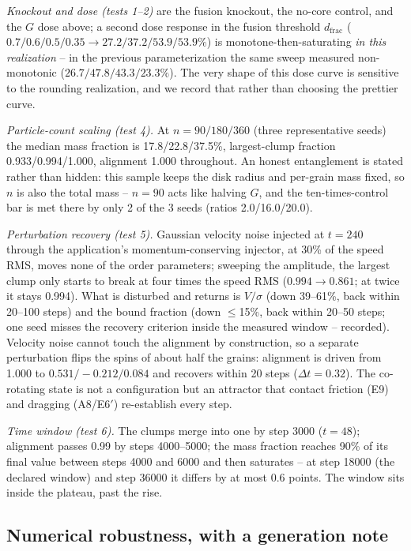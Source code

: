 \documentclass[aps,reprint,amsmath,amssymb,nofootinbib,superscriptaddress,floatfix]{revtex4-2}
\begin{document}
\emph{Knockout and dose (tests 1--2)} are the fusion knockout, the
no-core control, and the $G$ dose above; a second dose response in the
fusion threshold $d_{\mathrm{frac}}$ ($0.7/0.6/0.5/0.35 \rightarrow
27.2/37.2/53.9/53.9\%$) is monotone-then-saturating \emph{in this
realization} -- in the previous parameterization the same sweep
measured non-monotonic ($26.7/47.8/43.3/23.3\%$). The very shape of
this dose curve is sensitive to the rounding realization, and we record
that rather than choosing the prettier curve.

\emph{Particle-count scaling (test 4).} At $n=90/180/360$ (three
representative seeds) the median mass fraction is 17.8/22.8/37.5\%,
largest-clump fraction 0.933/0.994/1.000, alignment 1.000 throughout.
An honest entanglement is stated rather than hidden: this sample keeps
the disk radius and per-grain mass fixed, so $n$ is also the total mass
-- $n=90$ acts like halving $G$, and the ten-times-control bar is met
there by only 2 of the 3 seeds (ratios 2.0/16.0/20.0).

\emph{Perturbation recovery (test 5).} Gaussian velocity noise injected
at $t=240$ through the application's momentum-conserving injector, at
30\% of the speed RMS, moves none of the order parameters; sweeping the
amplitude, the largest clump only starts to break at four times the
speed RMS ($0.994\rightarrow0.861$; at twice it stays 0.994). What is
disturbed and returns is $V/\sigma$ (down 39--61\%, back within
20--100 steps) and the bound fraction (down $\leq$15\%, back within
20--50 steps; one seed misses the recovery criterion inside the
measured window -- recorded). Velocity noise cannot touch the
alignment by construction, so a separate perturbation flips the spins
of about half the grains: alignment is driven from 1.000 to
$0.531/-0.212/0.084$ and recovers within 20 steps ($\Delta t=0.32$).
The co-rotating state is not a configuration but an attractor that
contact friction (E9) and dragging (A8/E6$'$) re-establish every step.

\emph{Time window (test 6).} The clumps merge into one by step 3000
($t=48$); alignment passes 0.99 by steps 4000--5000; the mass fraction
reaches 90\% of its final value between steps 4000 and 6000 and then
saturates -- at step 18000 (the declared window) and step 36000 it
differs by at most 0.6 points. The window sits inside the plateau, past
the rise.

\subsection{Numerical robustness, with a generation note}
\end{document}
